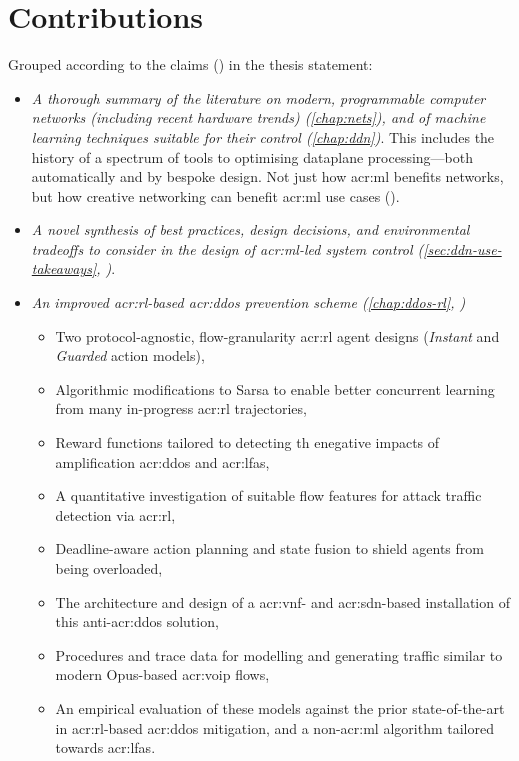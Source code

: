 \section{Contributions}
Grouped according to the claims () in the thesis statement:
\begin{itemize}
	\item \emph{A thorough summary of the literature on modern, programmable computer networks (including recent hardware trends) (\cref{chap:nets}), and of machine learning techniques suitable for their control (\cref{chap:ddn})}. This includes the history of a spectrum of tools to optimising dataplane processing---both automatically and by bespoke design. Not just how \gls{acr:ml} benefits networks, but how creative networking can benefit \gls{acr:ml} use cases ().
	\item \emph{A novel synthesis of best practices, design decisions, and environmental tradeoffs to consider in the design of \gls{acr:ml}-led system control (\cref{sec:ddn-use-takeaways}, )}.
	\item \emph{An improved \gls{acr:rl}-based \gls{acr:ddos} prevention scheme (\cref{chap:ddos-rl}, )}
	\begin{itemize}
		\item Two protocol-agnostic, flow-granularity \gls{acr:rl} agent designs (\emph{Instant} and \emph{Guarded} action models),
		\item Algorithmic modifications to Sarsa to enable better concurrent learning from many in-progress \gls{acr:rl} trajectories,
		\item Reward functions tailored to detecting th enegative impacts of amplification \gls{acr:ddos} and \glspl{acr:lfa},
		\item A quantitative investigation of suitable flow features for attack traffic detection via \gls{acr:rl},
		\item Deadline-aware action planning and state fusion to shield agents from being overloaded,
		\item The architecture and design of a \gls{acr:vnf}- and \gls{acr:sdn}-based installation of this anti-\gls{acr:ddos} solution,
		\item Procedures and trace data for modelling and generating traffic similar to modern Opus-based \gls{acr:voip} flows,
		\item An empirical evaluation of these models against the prior state-of-the-art in \gls{acr:rl}-based \gls{acr:ddos} mitigation, and a  non-\gls{acr:ml} algorithm tailored towards \glspl{acr:lfa}.

\end{itemize}
\end{itemize}
